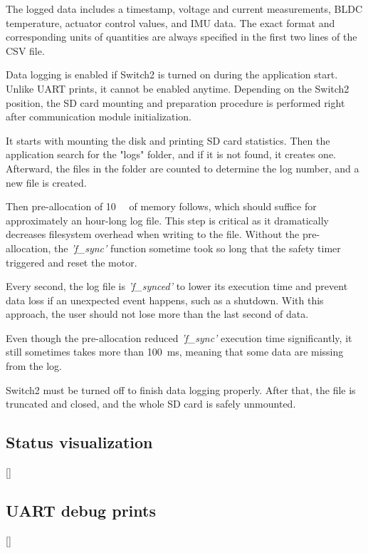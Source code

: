 The logged data includes a timestamp, voltage and current measurements, BLDC temperature, actuator control values, and IMU data. The exact format and corresponding units of quantities are always specified in the first two lines of the CSV file.

Data logging is enabled if Switch2 is turned on during the application start. Unlike UART prints, it cannot be enabled anytime. Depending on the Switch2 position, the SD card mounting and preparation procedure is performed right after communication module initialization.

It starts with mounting the disk and printing SD card statistics. Then the application search for the "logs" folder, and if it is not found, it creates one. Afterward, the files in the folder are counted to determine the log number, and a new file is created.

Then pre-allocation of \SI{10}{\mega\byte} of memory follows, which should suffice for approximately an \mbox{hour-long} log file. This step is critical as it dramatically decreases filesystem overhead when writing to the file. Without the pre-allocation, the \textit{'f\_sync'} function sometime took so long that the safety timer triggered and reset the motor.

Every second, the log file is \textit{'f\_synced'} to lower its execution time and prevent data loss if an unexpected event happens, such as a shutdown. With this approach, the user should not lose more than the last second of data.

Even though the pre-allocation reduced \textit{'f\_sync'} execution time significantly, it still sometimes takes more than \SI{100}{\ms}, meaning that some data are missing from the log.

Switch2 must be turned off to finish data logging properly. After that, the file is truncated and closed, and the whole SD card is safely unmounted.

\subsection{Status visualization}
[\todo]

\subsection{UART debug prints}
[\todo]